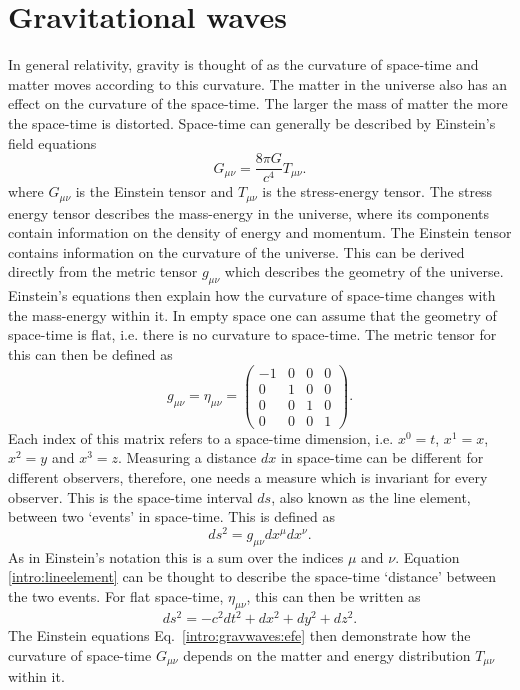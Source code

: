 \section{\label{intro:gravwaves}Gravitational waves}

In general relativity, gravity is thought of as the curvature of space-time and matter moves according to this curvature. 
The matter in the universe also has an effect on the curvature of the space-time.
The larger the mass of matter the more the space-time is distorted.
Space-time can generally be described by Einstein's field equations
\begin{equation}
\label{intro:gravwaves:efe}
    G_{\mu \nu} = \frac{8 \pi G}{c^4}T_{\mu \nu}.
\end{equation}
where $G_{\mu \nu}$ is the Einstein tensor and $T_{\mu \nu}$ is the stress-energy tensor.
The stress energy tensor describes the mass-energy in the universe, where its components contain information on the density of energy and momentum.
The Einstein tensor contains information on the curvature of the universe. 
This can be derived directly from the metric tensor $g_{\mu \nu}$ which describes the geometry of the universe.
Einstein's equations then explain how the curvature of space-time changes with the mass-energy within it. 
In empty space one can assume that the geometry of space-time is flat, i.e. there is no curvature to space-time. The metric tensor for this can then be defined as
\begin{equation}
g_{\mu \nu} = \eta_{\mu \nu} = \left(
\begin{matrix}
-1 & 0 & 0 & 0 \\
0 & 1 & 0 & 0 \\
0 & 0 & 1 & 0 \\
0 & 0 & 0 & 1 
\end{matrix}
\right).
\end{equation}
Each index of this matrix refers to a space-time dimension, i.e. $x^0 = t$, $x^1=x$, $x^2=y$ and $x^3=z$. 
Measuring a distance $dx$ in space-time can be different for different observers, therefore, one needs a measure which is invariant for every observer. 
This is the space-time interval $ds$, also known as the line element, between two `events' in space-time. 
This is defined as
\begin{equation}
\label{intro:lineelement}
    ds^2 = g_{\mu \nu} dx^{\mu}dx^{\nu}.
\end{equation}
As in Einstein's notation this is a sum over the indices $\mu$ and $\nu$.  
Equation \ref{intro:lineelement} can be thought to describe the space-time `distance' between the two events.
For flat space-time, $\eta_{\mu\nu}$, this can then be written as
%
\begin{equation}
    ds^2 = -c^2 dt^2 + dx^2 + dy^2 + dz^2.
\end{equation}
%
The Einstein equations Eq.~\ref{intro:gravwaves:efe} then demonstrate how the curvature of space-time $G_{\mu\nu}$ depends on the matter and energy distribution $T_{\mu \nu}$ within it.

